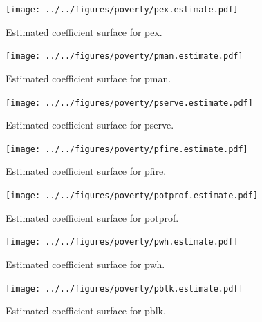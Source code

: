\documentclass[authoryear ,review]{elsarticle}
\begin{document}
					
			\begin{figure}
				\begin{center}
					\texttt{[image: ../../figures/poverty/pex.estimate.pdf]}
					\caption{Estimated coefficient surface for pex.\label{fig:pex}}
				\end{center}
			\end{figure}
						
			
			\begin{figure}
				\begin{center}
					\texttt{[image: ../../figures/poverty/pman.estimate.pdf]}
					\caption{Estimated coefficient surface for pman.\label{fig:pman}}
				\end{center}
			\end{figure}
						
			
			\begin{figure}
				\begin{center}
					\texttt{[image: ../../figures/poverty/pserve.estimate.pdf]}
					\caption{Estimated coefficient surface for pserve.\label{fig:pserve}}
				\end{center}
			\end{figure}
						
			
			\begin{figure}
				\begin{center}
					\texttt{[image: ../../figures/poverty/pfire.estimate.pdf]}
					\caption{Estimated coefficient surface for pfire.\label{fig:pfire}}
				\end{center}
			\end{figure}
						
			
			\begin{figure}
				\begin{center}
					\texttt{[image: ../../figures/poverty/potprof.estimate.pdf]}
					\caption{Estimated coefficient surface for potprof.\label{fig:potprof}}
				\end{center}
			\end{figure}
			
			
			
			\begin{figure}
				\begin{center}
					\texttt{[image: ../../figures/poverty/pwh.estimate.pdf]}
					\caption{Estimated coefficient surface for pwh.\label{fig:pwh}}
				\end{center}
			\end{figure}
						
			
			\begin{figure}
				\begin{center}
					\texttt{[image: ../../figures/poverty/pblk.estimate.pdf]}
					\caption{Estimated coefficient surface for pblk.\label{fig:pblk}}
				\end{center}
			\end{figure}
						
\end{document}

